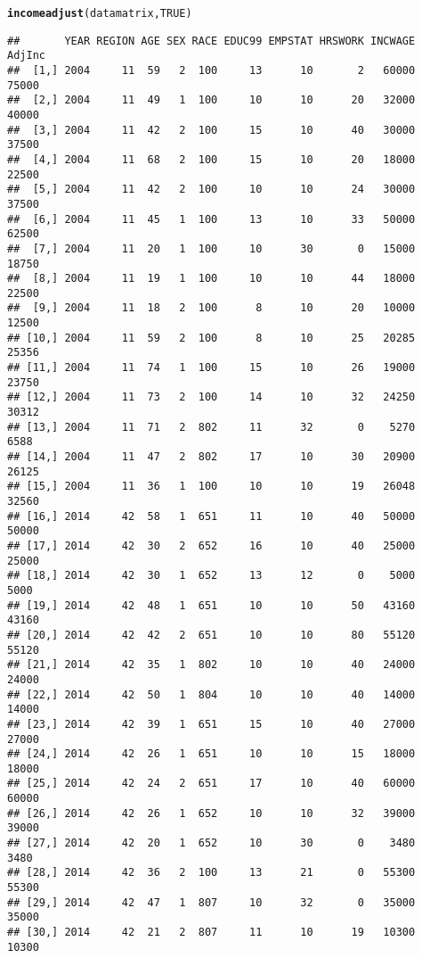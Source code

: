 \documentclass{article}\usepackage[]{graphicx}\usepackage[]{color}
\makeatletter
\newcommand{\hlnum}[1]{\textcolor[rgb]{0.686,0.059,0.569}{#1}}%
\newcommand{\hlstd}[1]{\textcolor[rgb]{0.345,0.345,0.345}{#1}}%
\newcommand{\hlkwd}[1]{\textcolor[rgb]{0.737,0.353,0.396}{\textbf{#1}}}%
\newenvironment{kframe}{%
 \def\at@end@of@kframe{}%
 \ifinner\ifhmode%
  \def\at@end@of@kframe{\end{minipage}}%
  \begin{minipage}{\columnwidth}%
 \fi\fi%
 \def\FrameCommand##1{\hskip\@totalleftmargin \hskip-\fboxsep
 \colorbox{shadecolor}{##1}\hskip-\fboxsep
     \hskip-\linewidth \hskip-\@totalleftmargin \hskip\columnwidth}%
 \MakeFramed {\advance\hsize-\width
   \@totalleftmargin\z@ \linewidth\hsize
   \@setminipage}}%
 {\par\unskip\endMakeFramed%
 \at@end@of@kframe}
\newenvironment{knitrout}{}{} %
\makeatother
\begin{document}
\begin{knitrout}
\begin{kframe}
\begin{alltt}
\hlkwd{incomeadjust}\hlstd{(datamatrix,} \hlnum{TRUE}\hlstd{)}
\end{alltt}
\begin{verbatim}
##       YEAR REGION AGE SEX RACE EDUC99 EMPSTAT HRSWORK INCWAGE AdjInc
##  [1,] 2004     11  59   2  100     13      10       2   60000  75000
##  [2,] 2004     11  49   1  100     10      10      20   32000  40000
##  [3,] 2004     11  42   2  100     15      10      40   30000  37500
##  [4,] 2004     11  68   2  100     15      10      20   18000  22500
##  [5,] 2004     11  42   2  100     10      10      24   30000  37500
##  [6,] 2004     11  45   1  100     13      10      33   50000  62500
##  [7,] 2004     11  20   1  100     10      30       0   15000  18750
##  [8,] 2004     11  19   1  100     10      10      44   18000  22500
##  [9,] 2004     11  18   2  100      8      10      20   10000  12500
## [10,] 2004     11  59   2  100      8      10      25   20285  25356
## [11,] 2004     11  74   1  100     15      10      26   19000  23750
## [12,] 2004     11  73   2  100     14      10      32   24250  30312
## [13,] 2004     11  71   2  802     11      32       0    5270   6588
## [14,] 2004     11  47   2  802     17      10      30   20900  26125
## [15,] 2004     11  36   1  100     10      10      19   26048  32560
## [16,] 2014     42  58   1  651     11      10      40   50000  50000
## [17,] 2014     42  30   2  652     16      10      40   25000  25000
## [18,] 2014     42  30   1  652     13      12       0    5000   5000
## [19,] 2014     42  48   1  651     10      10      50   43160  43160
## [20,] 2014     42  42   2  651     10      10      80   55120  55120
## [21,] 2014     42  35   1  802     10      10      40   24000  24000
## [22,] 2014     42  50   1  804     10      10      40   14000  14000
## [23,] 2014     42  39   1  651     15      10      40   27000  27000
## [24,] 2014     42  26   1  651     10      10      15   18000  18000
## [25,] 2014     42  24   2  651     17      10      40   60000  60000
## [26,] 2014     42  26   1  652     10      10      32   39000  39000
## [27,] 2014     42  20   1  652     10      30       0    3480   3480
## [28,] 2014     42  36   2  100     13      21       0   55300  55300
## [29,] 2014     42  47   1  807     10      32       0   35000  35000
## [30,] 2014     42  21   2  807     11      10      19   10300  10300
\end{verbatim}
\end{kframe}
\end{knitrout}
\end{document}
